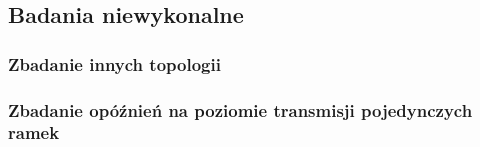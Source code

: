 \subsection{Badania niewykonalne}

\subsubsection{Zbadanie innych topologii}

\subsubsection{Zbadanie opóźnień na poziomie transmisji pojedynczych ramek}
%
%
%
%
